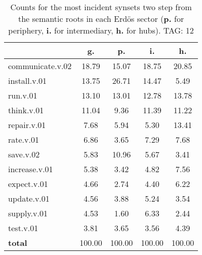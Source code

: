 \begin{table}[h!]
\begin{center}
\begin{tabular}{| l | c | c | c | c |}\hline
 & g. & p. & i. & h. \\\hline
communicate.v.02 & 18.79  & 15.07  & 18.75  & 20.85 \\\hline
install.v.01 & 13.75  & 26.71  & 14.47  & 5.49 \\\hline
run.v.01 & 13.10  & 13.01  & 12.78  & 13.78 \\\hline
think.v.01 & 11.04  & 9.36  & 11.39  & 11.22 \\\hline
repair.v.01 & 7.68  & 5.94  & 5.30  & 13.41 \\\hline
rate.v.01 & 6.86  & 3.65  & 7.29  & 7.68 \\\hline
save.v.02 & 5.83  & 10.96  & 5.67  & 3.41 \\\hline
increase.v.01 & 5.38  & 3.42  & 4.82  & 7.56 \\\hline
expect.v.01 & 4.66  & 2.74  & 4.40  & 6.22 \\\hline
update.v.01 & 4.56  & 3.88  & 5.24  & 3.54 \\\hline
supply.v.01 & 4.53  & 1.60  & 6.33  & 2.44 \\\hline
test.v.01 & 3.81  & 3.65  & 3.56  & 4.39 \\\hline
{{\bf total}} & 100.00  & 100.00  & 100.00  & 100.00 \\\hline
\end{tabular}
\caption{Counts for the most incident synsets two step from the semantic roots in each Erd\"os sector ({\bf p.} for periphery, {\bf i.} for intermediary, {\bf h.} for hubs). TAG: 12}
\end{center}
\end{table}